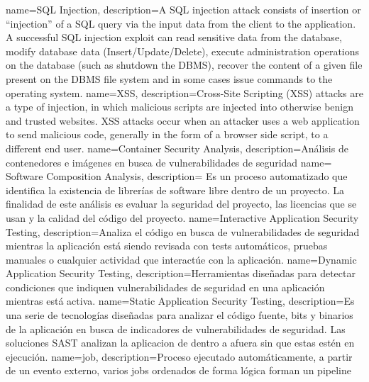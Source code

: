 {
        name=SQL Injection,
        description={A SQL injection attack consists of insertion or “injection” of a SQL query via the input data from the client to the application. A successful SQL injection exploit can read sensitive data from the database, modify database data (Insert/Update/Delete), execute administration operations on the database (such as shutdown the DBMS), recover the content of a given file present on the DBMS file system and in some cases issue commands to the operating system.}
}
{
        name=XSS,
        description={Cross-Site Scripting (XSS) attacks are a type of injection, in which malicious scripts are injected into otherwise benign and trusted websites. XSS attacks occur when an attacker uses a web application to send malicious code, generally in the form of a browser side script, to a different end user.}
}
{
        name=Container Security Analysis,
        description={Análisis de contenedores e imágenes en busca de
        vulnerabilidades de seguridad}
}
{
        name= Software Composition Analysis,
        description= {Es un proceso automatizado que identifica la existencia de
        librerías de software libre dentro de un proyecto. La finalidad de este
        análisis es evaluar la seguridad del proyecto, las licencias que se usan
        y la calidad del código del proyecto.}
}
{
        name=Interactive Application Security Testing,
        description={Analiza el código en busca de vulnerabilidades de seguridad
        mientras la aplicación está siendo revisada con tests automáticos,
        pruebas manuales o cualquier actividad que interactúe con la aplicación.}
}
{
        name=Dynamic Application Security Testing,
        description={Herramientas diseñadas para detectar condiciones que
        indiquen vulnerabilidades de seguridad en una aplicación mientras está
        activa.}
}
{
        name=Static Application Security Testing,
        description={Es una serie de tecnologías diseñadas para analizar el
        código fuente, bits y binarios de la aplicación en busca de indicadores
        de vulnerabilidades de seguridad. Las soluciones SAST analizan la
        aplicacion de dentro a afuera sin que estas estén en ejecución.  }
}
{
        name=job,
        description={Proceso ejecutado automáticamente, a partir de un evento externo, varios jobs ordenados de forma lógica forman un pipeline}
}
